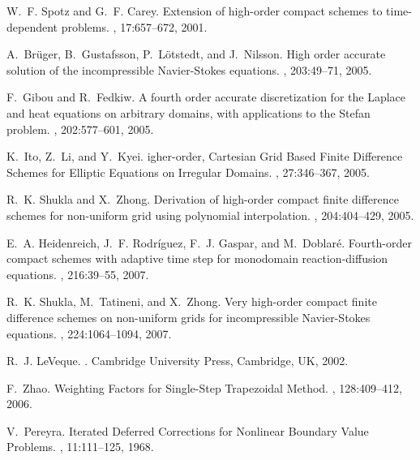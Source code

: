 \documentclass[fleqn,12pt,twoside]{article}
\begin{document}
\begin{thebibliography}{10}

W.~F. Spotz and G.~F. Carey.
\newblock Extension of high-order compact schemes to time-dependent problems.
, 17:657--672, 2001.

A.~Br\"uger, B.~Gustafsson, P.~L\"otstedt, and J.~Nilsson.
\newblock High order accurate solution of the incompressible {N}avier-{S}tokes
  equations.
, 203:49--71, 2005.

F.~Gibou and R.~Fedkiw.
\newblock A fourth order accurate discretization for the {L}aplace and heat
  equations on arbitrary domains, with applications to the {S}tefan problem.
, 202:577--601, 2005.

K.~Ito, Z.~Li, and Y.~Kyei.
igher-order, {C}artesian {G}rid {B}ased {F}inite {D}ifference
  {S}chemes for {E}lliptic {E}quations on {I}rregular {D}omains.
, 27:346--367, 2005.

R.~K. Shukla and X.~Zhong.
\newblock Derivation of high-order compact finite difference schemes for
  non-uniform grid using polynomial interpolation.
, 204:404--429, 2005.

E.~A. Heidenreich, J.~F. Rodr\'iguez, F.~J. Gaspar, and M.~Doblar\'e.
\newblock Fourth-order compact schemes with adaptive time step for monodomain
  reaction-diffusion equations.
, 216:39--55, 2007.

R.~K. Shukla, M.~Tatineni, and X.~Zhong.
\newblock Very high-order compact finite difference schemes on non-uniform
  grids for incompressible {N}avier-{S}tokes equations.
, 224:1064--1094, 2007.

R.~J. LeVeque.
.
\newblock Cambridge University Press, Cambridge, UK, 2002.

F.~Zhao.
\newblock Weighting {F}actors for {S}ingle-{S}tep {T}rapezoidal {M}ethod.
, 128:409--412, 2006.

V.~Pereyra.
\newblock Iterated {D}eferred {C}orrections for {N}onlinear {B}oundary {V}alue
  {P}roblems.
, 11:111--125, 1968.


\end{thebibliography}
\end{document}
